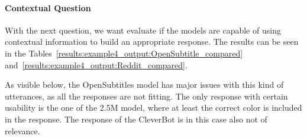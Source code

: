 \paragraph{Contextual Question} 
With the next question, we want evaluate if the models are capable of using contextual information to build an appropriate response. The results can be seen in the Tables~\ref{results:example4_output:OpenSubtitle_compared} and~\ref{results:example4_output:Reddit_compared}.

As visible below, the OpenSubtitles model has major issues with this kind of utterances, as all the responses are not fitting. The only response with certain usability is the one of the 2.5M model, where at least the correct color is included in the response. The response of the CleverBot is in this case also not of relevance.

